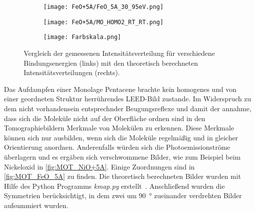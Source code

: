 \begin{figure}
\begin{subfigure}[t]{0.48\textwidth}
                \label{fig:MOT_FeO+5A_theo_3}
            \end{subfigure}
            \centering
            \begin{subfigure}[t]{0.48\textwidth}
                \centering
                \texttt{[image: FeO+5A/FeO\_5A\_30\_95eV.png]}
                \label{fig:MOT_FeO+5A_exp_4}
            \end{subfigure}
            \begin{subfigure}[t]{0.48\textwidth}
                \centering
                \texttt{[image: FeO+5A/MO\_HOMO2\_RT\_RT.png]}
                \label{fig:MOT_FeO+5A_theo_4}
            \end{subfigure}
            \begin{subfigure}[t]{\textwidth}
                \centering
                \texttt{[image: Farbskala.png]}
            \end{subfigure}
            \caption{Vergleich der gemessenen Intensitätsverteilung für verschiedene Bindungsenergien (links) mit den theoretisch berechneten Intensitätsverteilungen (rechts).}
            \label{fig:MOT_FeO_5A}
        \end{figure}

        Das Aufdampfen einer Monolage Pentacene brachte kein homogenes und von einer geordneten Struktur herrührendes LEED-Bild zustande.
        Im Widerspruch zu dem nicht vorhandensein entsprechnder Beugungsreflexe und damit der annahme, dass sich die Moleküle nicht auf der Oberfläche ordnen sind in den Tomographiebildern Merkmale von Molekülen zu erkennen.
        Diese Merkmale können sich nur ausbilden, wenn sich die Moleküle regelmäßig und in gleicher Orientierung anordnen.
        Anderenfalls würden sich die Photoemissionströme überlagern und es ergäben sich verschwommene Bilder, wie zum Beispiel beim Nickeloxid in \autoref{fig:MOT_NiO+5A}.
        Einige Zuordnungen sind in \autoref{fig:MOT_FeO_5A} zu finden.
        Die theoretisch berechneten Bilder wurden mit Hilfe des Python Programms \textit{kmap.py} erstellt~\cite{brandstetter_kmappy_2021}.
        Anschließend wurden die Symmetrien berücksichtigt, in dem zwei um \SI{90}{\degree} zueinander verdrehten Bilder aufsummiert wurden.

